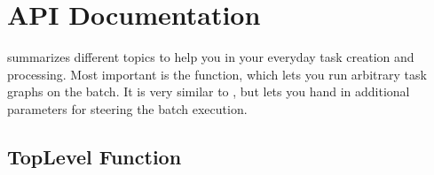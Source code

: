\documentclass[letterpaper,10pt,english]{sphinxmanual}
\begin{document}
\begin{sphinxVerbatim}[commandchars=\\\{\}]
 
      

     
           
              


   
     
\end{sphinxVerbatim}


\section{API Documentation}
\label{\detokenize{documentation/api:api-documentation}}\label{\detokenize{documentation/api:api-documentation-label}}\label{\detokenize{documentation/api::doc}}
 summarizes different topics to help you in your everyday task
creation and processing.
Most important is the {\hyperref[\detokenize{documentation/api:b2luigi.process}]{}} function, which lets you run
arbitrary task graphs on the batch.
It is very similar to , but lets you hand in additional parameters
for steering the batch execution.


\subsection{Top\sphinxhyphen{}Level Function}
\label{\detokenize{documentation/api:top-level-function}}
\end{document}
